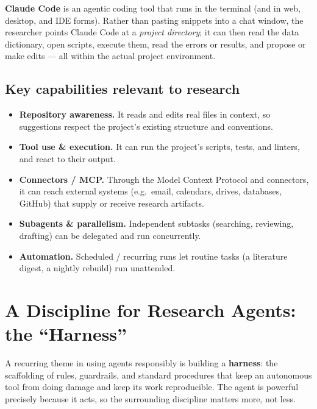 \documentclass[11pt]{article}
\begin{document}
\textbf{Claude Code} is an agentic coding tool that runs in the terminal (and in
web, desktop, and IDE forms). Rather than pasting snippets into a chat window,
the researcher points Claude Code at a \emph{project directory}; it can then read
the data dictionary, open scripts, execute them, read the errors or results, and
propose or make edits --- all within the actual project environment.

\subsection{Key capabilities relevant to research}
\begin{itemize}[leftmargin=1.4em]
  \item \textbf{Repository awareness.} It reads and edits real files in context,
  so suggestions respect the project's existing structure and conventions.
  \item \textbf{Tool use \& execution.} It can run the project's scripts, tests,
  and linters, and react to their output.
  \item \textbf{Connectors / MCP.} Through the Model Context Protocol and
  connectors, it can reach external systems (e.g.\ email, calendars, drives,
  databases, GitHub) that supply or receive research artifacts.
  \item \textbf{Subagents \& parallelism.} Independent subtasks (searching,
  reviewing, drafting) can be delegated and run concurrently.
  \item \textbf{Automation.} Scheduled / recurring runs let routine tasks (a
  literature digest, a nightly rebuild) run unattended.
\end{itemize}

\section{A Discipline for Research Agents: the ``Harness''}

A recurring theme in using agents responsibly is building a \textbf{harness}:
the scaffolding of rules, guardrails, and standard procedures that keep an
autonomous tool from doing damage and keep its work reproducible. The agent is
powerful precisely because it acts, so the surrounding discipline matters more,
not less.
\end{document}
